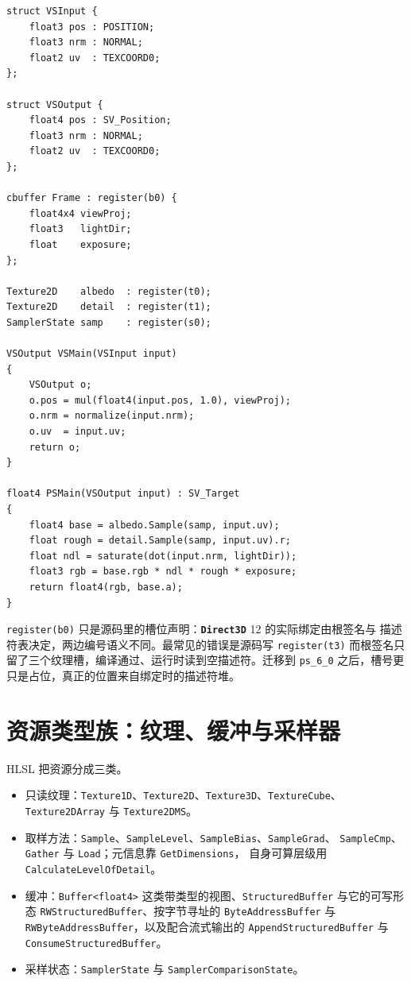 \documentclass[12pt,a4paper,fontset=fandol]{ctexbook}
\newcommand{\Tp}[1]{\texttt{#1}}
\newcommand{\Bk}{\discretionary{}{}{}}
\newcommand{\Lib}[1]{\textbf{\texttt{#1}}}
\newcommand{\Lang}[1]{\textsf{#1}}
\newcommand{\HSL}{\Lang{HLSL}}
\begin{document}
\begin{lstlisting}[style=hlslstyle,caption={完整的 VS 与 PS：cbuffer、Texture2D 取样、语义化的输入输出},label={lst:ch06-vs-ps}]
struct VSInput {
    float3 pos : POSITION;
    float3 nrm : NORMAL;
    float2 uv  : TEXCOORD0;
};

struct VSOutput {
    float4 pos : SV_Position;
    float3 nrm : NORMAL;
    float2 uv  : TEXCOORD0;
};

cbuffer Frame : register(b0) {
    float4x4 viewProj;
    float3   lightDir;
    float    exposure;
};

Texture2D    albedo  : register(t0);
Texture2D    detail  : register(t1);
SamplerState samp    : register(s0);

VSOutput VSMain(VSInput input)
{
    VSOutput o;
    o.pos = mul(float4(input.pos, 1.0), viewProj);
    o.nrm = normalize(input.nrm);
    o.uv  = input.uv;
    return o;
}

float4 PSMain(VSOutput input) : SV_Target
{
    float4 base = albedo.Sample(samp, input.uv);
    float rough = detail.Sample(samp, input.uv).r;
    float ndl = saturate(dot(input.nrm, lightDir));
    float3 rgb = base.rgb * ndl * rough * exposure;
    return float4(rgb, base.a);
}
\end{lstlisting}

\begin{warning}[title={\Tp{register} 号与 API 侧的绑定必须一致}]
\Tp{register(b0)} 只是源码里的槽位声明：\Lib{Direct3D} 12 的实际绑定由根签名与
描述符表决定，两边编号语义不同。最常见的错误是源码写 \Tp{register(t3)} 而根签名只
留了三个纹理槽，编译通过、运行时读到空描述符。迁移到 \Tp{ps\_6\_0} 之后，槽号更
只是占位，真正的位置来自绑定时的描述符堆。
\end{warning}

\section{资源类型族：纹理、缓冲与采样器}

\HSL{} 把资源分成三类。
\begin{itemize}
  \item 只读纹理：\Tp{Texture1D}、\Tp{Texture2D}、\Tp{Texture3D}、\Tp{TextureCube}、
        \Tp{Texture2D{\Bk}Array} 与 \Tp{Texture2DMS}。
  \item 取样方法：\Tp{Sample}、\Tp{SampleLevel}、\Tp{Sample{\Bk}Bias}、\Tp{Sample{\Bk}Grad}、
        \Tp{SampleCmp}、\Tp{Gather} 与 \Tp{Load}；元信息靠 \Tp{Get{\Bk}Dimensions}，
        自身可算层级用 \Tp{Calculate{\Bk}Level{\Bk}Of{\Bk}Detail}。
  \item 缓冲：\Tp{Buffer<float4>} 这类带类型的视图、\Tp{Structured{\Bk}Buffer} 与它的可写形态
        \Tp{RW{\Bk}Structured{\Bk}Buffer}、按字节寻址的 \Tp{Byte{\Bk}Address{\Bk}Buffer} 与
        \Tp{RWByte{\Bk}Address{\Bk}Buffer}，以及配合流式输出的 \Tp{Append{\Bk}Structured{\Bk}Buffer}
        与 \Tp{Consume{\Bk}Structured{\Bk}Buffer}。
  \item 采样状态：\Tp{Sampler{\Bk}State} 与 \Tp{Sampler{\Bk}Comparison{\Bk}State}。
\end{itemize}
\end{document}
